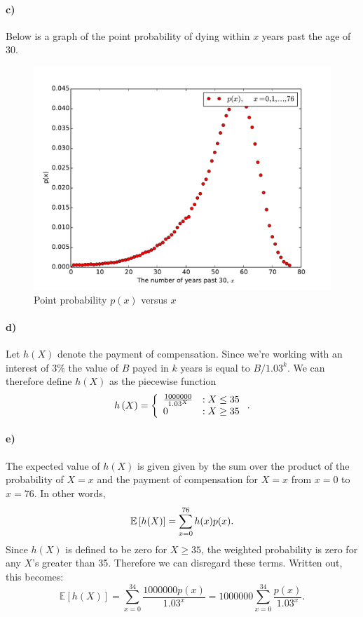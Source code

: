 \documentclass[a4paper]{article}
\theoremstyle{definition}
\begin{document}
\paragraph{c)}
Below is a graph of the point probability of dying within $x$ years past the age of 30.
\begin{figure}[h]
  \centering
  \includegraphics[width=0.7\linewidth]{./src/point_probability.pdf}
  \caption{Point probability $p(x)$ versus $x$}
  \end{figure}
\paragraph{d)}
Let $h\left( X \right)$ denote the payment of compensation. Since we're working
with an interest of $3\%$ the value of $B$ payed in $k$ years is equal to
$B/1.03^k$.  We can therefore define $h(X)$ as the piecewise function
\begin{equation}
  \notag
  h\left( X \right) = \left\{\begin{array}{lr}
    \frac{1000000}{1.03^X} & : X \leq 35 \\
    0 & : X \geq 35
    \end{array}
  \right..
\end{equation}

\paragraph{e)}

The expected value of $h(X)$ is given given by the sum over the product of the
probability of $X = x$ and the payment of compensation for $X = x$ from $x=0$
to $x = 76$. In other words, 
\begin{equation}
  \notag
  \mathbb{E}\left[ h(X) \right] = \sum_{x=0}^{76}h(x)p(x).
\end{equation}
Since $h(X)$ is defined to be zero for $X \geq 35$, the weighted probability is
zero for any $X$'s greater than 35. Therefore we can disregard these
terms.  Written out, this becomes:
\begin{equation}
  \label{eq:expct}
  \mathbb{E}\left[ h(X) \right] = \sum_{x=0}^{34} \frac{1000000p(x)}{1.03^x} = 1000000\sum_{x=0}^{34}\frac{p(x)}{1.03^x}.
\end{equation}
\end{document}
